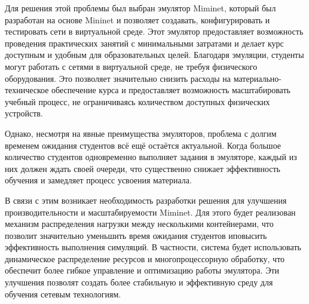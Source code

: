 Для решения этой проблемы был выбран эмулятор Miminet, который был разработан на основе Mininet и позволяет создавать, конфигурировать и тестировать сети в виртуальной среде.
Этот эмулятор предоставляет возможность проведения практических занятий с минимальными затратами и делает курс доступным и удобным для образовательных целей.
Благодаря эмуляции, студенты могут работать с сетями в виртуальной среде, не требуя физического оборудования.
Это позволяет значительно снизить расходы на материально-техническое обеспечение курса и предоставляет возможность масштабировать учебный процесс, не ограничиваясь количеством доступных физических устройств.

Однако, несмотря на явные преимущества эмуляторов, проблема с долгим временем ожидания студентов всё ещё остаётся актуальной. Когда большое количество студентов одновременно выполняет задания в эмуляторе, каждый из них должен ждать своей очереди, что существенно снижает эффективность обучения и замедляет процесс усвоения материала.

В связи с этим возникает необходимость разработки решения для улучшения производительности и масштабируемости Miminet\cite{miminet}.
Для этого будет реализован механизм распределения нагрузки между несколькими контейнерами, что позволит значительно уменьшить время ожидания студентов иповысить эффективность выполнения симуляций.
В частности, система будет использовать динамическое распределение ресурсов и многопроцессорную обработку, что обеспечит более гибкое управление и оптимизацию работы эмулятора.
Эти улучшения позволят создать более стабильную и эффективную среду для обучения сетевым технологиям.
